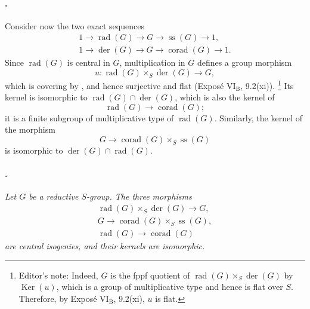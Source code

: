 \paragraph{.}
Consider now the two exact sequences
\[
\begin{gathered}
  1\longrightarrow\operatorname{rad}(G)
  \longrightarrow G
  \longrightarrow\operatorname{ss}(G)
  \longrightarrow 1,\\
  1\longrightarrow\operatorname{der}(G)
  \longrightarrow G
  \longrightarrow\operatorname{corad}(G)
  \longrightarrow 1.
\end{gathered}
\]
Since \(\operatorname{rad}(G)\) is central in \(G\),
multiplication in \(G\) defines a group morphism
\[
  u:\operatorname{rad}(G)\times_S\operatorname{der}(G)
  \longrightarrow G,
\]
which is covering by \textup{}, and hence surjective and
flat \textup{(Exposé \(\mathrm{VI_B}\), 9.2\textup{(xi)})}.
\footnote{Editor's note: Indeed, \(G\) is the fppf quotient of
\(\operatorname{rad}(G)\times_S\operatorname{der}(G)\) by
\(\operatorname{Ker}(u)\), which is a group of multiplicative
type and hence is flat over \(S\). Therefore, by Exposé
\(\mathrm{VI_B}\), 9.2\textup{(xi)}, \(u\) is flat.}
Its kernel is isomorphic to
\(\operatorname{rad}(G)\cap\operatorname{der}(G)\), which is also
the kernel of
\[
  \operatorname{rad}(G)\longrightarrow\operatorname{corad}(G);
\]
it is a finite subgroup of multiplicative type of
\(\operatorname{rad}(G)\). Similarly, the kernel of the morphism
\[
  G\longrightarrow
  \operatorname{corad}(G)\times_S\operatorname{ss}(G)
\]
is isomorphic to
\(\operatorname{der}(G)\cap\operatorname{rad}(G)\).

\paragraph{.}
\textit{Let \(G\) be a reductive \(S\)-group. The three morphisms}
\[
\begin{gathered}
  \operatorname{rad}(G)\times_S\operatorname{der}(G)
    \longrightarrow G,\\
  G\longrightarrow
    \operatorname{corad}(G)\times_S\operatorname{ss}(G),\\
  \operatorname{rad}(G)\longrightarrow\operatorname{corad}(G)
\end{gathered}
\]
\textit{are central isogenies, and their kernels are isomorphic.}

